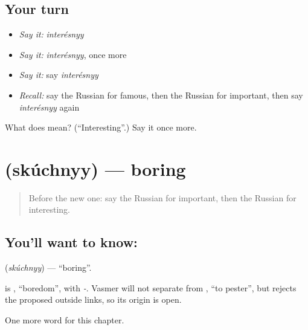 \subsection*{Your turn}
\begin{itemize}
\raggedright
  \item \emph{Say it:} \emph{interésnyy}
  \item \emph{Say it:} \emph{interésnyy}, once more
  \item \emph{Say it:} say \emph{interésnyy}
  \item \emph{Recall:} say the Russian for famous, then the Russian for important, then say \emph{interésnyy} again
\end{itemize}

\begin{tcolorbox}[breakable,colback=teal!4,colframe=teal!35!black,title={Before you move on}]
What does  mean? (\textquotedblleft{}Interesting\textquotedblright{}.) Say it once more.
\end{tcolorbox}
\section[\texorpdfstring{\ru{скучный} (skúchnyy)}{скучный (skúchnyy)}]{ (skúchnyy) — boring}

\label{lesson:RU-C126-boring}



\begin{quote}
Before the new one: say the Russian for important, then the Russian for interesting.
\end{quote}

\subsection*{You'll want to know: }
\textbf{} (\emph{skúchnyy}) — \textquotedblleft{}boring\textquotedblright{}.

\begin{cousinweb}
\textbf{} is \emph{}, \textquotedblleft{}boredom\textquotedblright{}, with \emph{-}. Vasmer will not separate \emph{} from \emph{}, \textquotedblleft{}to pester\textquotedblright{}, but rejects the proposed outside links, so its origin is open.
\end{cousinweb}

\begin{grammarlens}[title={What you've built}]
One more word for this chapter.
\end{grammarlens}


